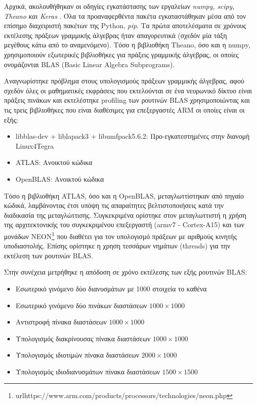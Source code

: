 Αρχικά, ακολουθήθηκαν οι οδηγίες εγκατάστασης των εργαλείων \emph{numpy, scipy, Theano και Keras}
. Όλα τα προαναφερθέντα πακέτα εγκαταστάθηκαν μέσα από τον επίσημο διαχειριστή πακέτων της Python, \emph{pip}.
Τα πρώτα αποτελέσματα σε χρόνους εκτέλεσης πράξεων γραμμικής άλγεβρας ήταν
απαγορευτικά (σχεδόν μία τάξη μεγέθους κάτω από το αναμενόμενο).
Τόσο η βιβλιοθήκη Theano, όσο και η numpy, χρησιμοποιούν εξωτερικές βιβλιοθήκες
για πράξεις γραμμικής άλγεβρας, οι οποίες ονομάζονται BLAS (Basic Linear Algebra Subprograms).

Αναγνωρίστηκε πρόβλημα στους υπολογισμούς πράξεων γραμμικής άλγεβρας,
αφού σχεδόν όλες οι μαθηματικές εκφράσεις που εκτελούνται σε ένα
νευρωνικό δίκτυο είναι πράξεις πινάκων και εκτελέστηκε profiling των
ρουτινών BLAS χρησιμοποιώντας και τις τρεις βιβλιοθήκες που είναι διαθέσιμες για
επεξεργαστές ARM οι οποίες είναι οι εξής:
\begin{itemize}
  \item{libblas-dev + liblapack3 + libumfpack5.6.2: Προ-εγκατεστημένες στην διανομή Linux4Tegra}
  \item{ATLAS: Ανοικτού κώδικα}
  \item{OpenBLAS: Ανοικτού κώδικα}
\end{itemize}

Τόσο η βιβλιοθήκη ATLAS, όσο και η OpenBLAS, μεταγλωττίστηκαν από πηγαίο κώδικά,
λαμβάνοντας έτσι υπόψη τις απαραίτητες βελτιστοποιήσεις κατά την διαδικασία
της μεταγλώττισης.
Συγκεκριμένα ορίστηκε στον μεταγλωττιστή η χρήση της αρχιτεκτονικής του
συγκεκριμένου επεξεργαστή (armv7 - Cortex-A15) και των μονάδων
NEON\footnote{url{https://www.arm.com/products/processors/technologies/neon.php}}
που διαθέτει για τον υπολογισμό πράξεων με αριθμούς κινητής %
υποδιαστολής. Επίσης ορίστηκε η χρηση τεσσάρων νημάτων (threads)
για την εκτέλεση των ρουτινών BLAS.

Στην συνέχεια μετρήθηκε η απόδοση σε χρόνο εκτέλεσης των εξής ρουτινών BLAS:
\begin{itemize}
  \item{Εσωτερικό γινόμενο δύο διανυσμάτων με 1000 στοιχεία το καθένα}
  \item{Εσωτερικό γινόμενο δύο πινάκων διαστάσεων $1000 \times 1000$}
  \item{Αντιστροφή πίνακα διαστάσεων $1000 \times 1000$}
  \item{Υπολογισμός διακρίνουσας πίνακα διαστάσεων $1000 \times 1000$}
  \item{Υπολογισμός ιδιοτιμών πίνακα διαστάσεων $2000 \times 1000$}
  \item{Υπολογισμός ιδιοδιανυσμάτων πίνακα διαστάσεων $1500 \times 1500$}
\end{itemize}

